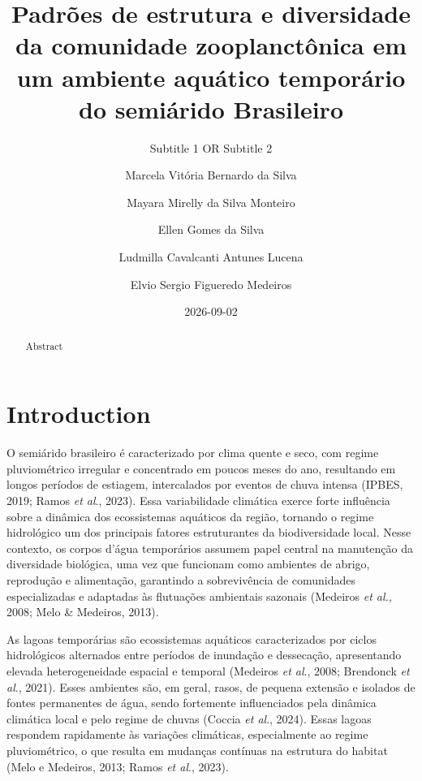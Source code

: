 \documentclass[
  american,
  letterpaper,
  DIV=11,
  numbers=noendperiod]{scrartcl}
\title{Padrões de estrutura e diversidade da comunidade zooplanctônica
em um ambiente aquático temporário do semiárido Brasileiro}
\subtitle{Subtitle 1 OR Subtitle 2}
\author{Marcela Vitória Bernardo da Silva \and Mayara Mirelly da Silva
Monteiro \and Ellen Gomes da Silva \and Ludmilla Cavalcanti Antunes
Lucena \and Elvio Sergio Figueredo Medeiros}
\date{2026-09-02}
\renewcommand*\contentsname{Table of contents}
\newcommand\contentsname{Table of contents}
\begin{document}
\maketitle
\begin{abstract}
Abstract
\end{abstract}

\renewcommand*\contentsname{Table of contents}
{
\hypersetup{linkcolor=}
\setcounter{tocdepth}{3}
\tableofcontents
}
\listoffigures
\listoftables

\section{Introduction}\label{introduction}

O semiárido brasileiro é caracterizado por clima quente e seco, com
regime pluviométrico irregular e concentrado em poucos meses do ano,
resultando em longos períodos de estiagem, intercalados por eventos de
chuva intensa (IPBES, 2019; Ramos \emph{et al}., 2023). Essa
variabilidade climática exerce forte influência sobre a dinâmica dos
ecossistemas aquáticos da região, tornando o regime hidrológico um dos
principais fatores estruturantes da biodiversidade local. Nesse
contexto, os corpos d'água temporários assumem papel central na
manutenção da diversidade biológica, uma vez que funcionam como
ambientes de abrigo, reprodução e alimentação, garantindo a
sobrevivência de comunidades especializadas e adaptadas às flutuações
ambientais sazonais (Medeiros \emph{et al.}, 2008; Melo \& Medeiros,
2013).

As lagoas temporárias são ecossistemas aquáticos caracterizados por
ciclos hidrológicos alternados entre períodos de inundação e dessecação,
apresentando elevada heterogeneidade espacial e temporal (Medeiros
\emph{et al}., 2008; Brendonck \emph{et al}., 2021). Esses ambientes
são, em geral, rasos, de pequena extensão e isolados de fontes
permanentes de água, sendo fortemente influenciados pela dinâmica
climática local e pelo regime de chuvas (Coccia \emph{et al}., 2024).
Essas lagoas respondem rapidamente às variações climáticas,
especialmente ao regime pluviométrico, o que resulta em mudanças
contínuas na estrutura do habitat (Melo e Medeiros, 2013; Ramos \emph{et
al}., 2023).
\end{document}
